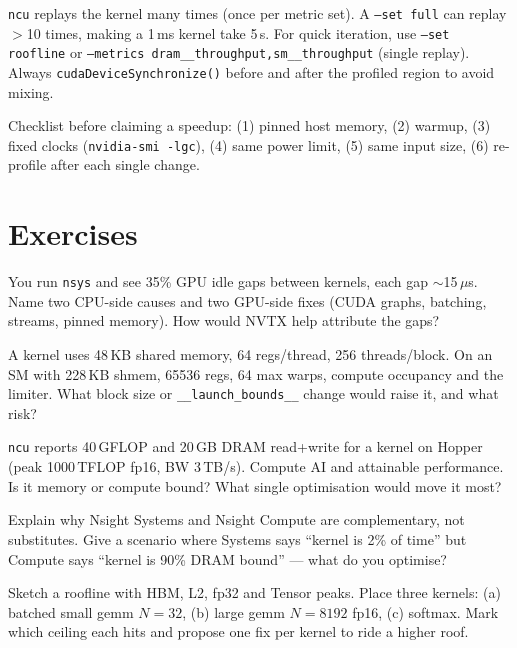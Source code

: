 \texttt{ncu} replays the kernel many times (once per metric set). A \texttt{--set full} can replay $>$10 times, making a 1\,ms kernel take 5\,s. For quick iteration, use \texttt{--set roofline} or \texttt{--metrics dram\_\_throughput,sm\_\_throughput} (single replay). Always \texttt{cudaDeviceSynchronize()} before and after the profiled region to avoid mixing.

Checklist before claiming a speedup: (1) pinned host memory, (2) warmup, (3) fixed clocks (\texttt{nvidia-smi -lgc}), (4) same power limit, (5) same input size, (6) re-profile after each single change.

\section{Exercises}
\begin{exercise}
You run \texttt{nsys} and see 35\% GPU idle gaps between kernels, each gap $\sim$15\,$\mu$s. Name two CPU-side causes and two GPU-side fixes (CUDA graphs, batching, streams, pinned memory). How would NVTX help attribute the gaps?
\end{exercise}
\begin{exercise}
A kernel uses 48\,KB shared memory, 64 regs/thread, 256 threads/block. On an SM with 228\,KB shmem, 65536 regs, 64 max warps, compute occupancy and the limiter. What block size or \texttt{\_\_launch\_bounds\_\_} change would raise it, and what risk?
\end{exercise}
\begin{exercise}
\texttt{ncu} reports 40\,GFLOP and 20\,GB DRAM read+write for a kernel on Hopper (peak 1000\,TFLOP fp16, BW 3\,TB/s). Compute AI and attainable performance. Is it memory or compute bound? What single optimisation would move it most?
\end{exercise}
\begin{exercise}
Explain why Nsight Systems and Nsight Compute are complementary, not substitutes. Give a scenario where Systems says ``kernel is 2\% of time'' but Compute says ``kernel is 90\% DRAM bound'' --- what do you optimise?
\end{exercise}
\begin{exercise}
Sketch a roofline with HBM, L2, fp32 and Tensor peaks. Place three kernels: (a) batched small gemm $N{=}32$, (b) large gemm $N{=}8192$ fp16, (c) softmax. Mark which ceiling each hits and propose one fix per kernel to ride a higher roof.
\end{exercise}

